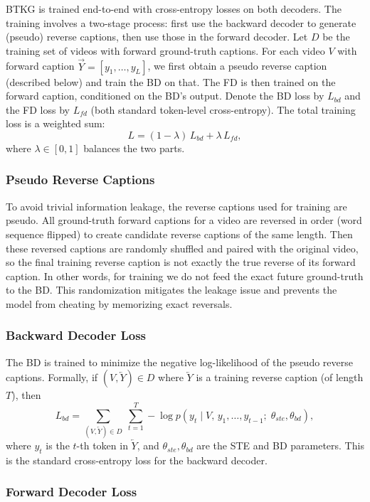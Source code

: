 BTKG is trained end-to-end with cross-entropy losses on both decoders. The training involves a two-stage process: first use the backward decoder to generate (pseudo) reverse captions, then use those in the forward decoder. Let $D$ be the training set of videos with forward ground-truth captions. For each video $V$ with forward caption $\overrightarrow{Y}=[y_1,\dots,y_L]$, we first obtain a pseudo reverse caption (described below) and train the BD on that. The FD is then trained on the forward caption, conditioned on the BD's output. Denote the BD loss by $L_{bd}$ and the FD loss by $L_{fd}$ (both standard token-level cross-entropy). The total training loss is a weighted sum:
$$
L = (1-\lambda)\,L_{bd} + \lambda\,L_{fd},
$$
where $\lambda\in[0,1]$ balances the two parts.

\subsubsection{Pseudo Reverse Captions}

To avoid trivial information leakage, the reverse captions used for training are pseudo. All ground-truth forward captions for a video are reversed in order (word sequence flipped) to create candidate reverse captions of the same length. Then these reversed captions are randomly shuffled and paired with the original video, so the final training reverse caption is not exactly the true reverse of its forward caption. In other words, for training we do not feed the exact future ground-truth to the BD. This randomization mitigates the leakage issue and prevents the model from cheating by memorizing exact reversals.

\subsubsection{Backward Decoder Loss}

The BD is trained to minimize the negative log-likelihood of the pseudo reverse captions. Formally, if $(V,\overleftarrow{Y})\in D$ where $\overleftarrow{Y}$ is a training reverse caption (of length $T$), then
$$
L_{bd} = \sum_{(V,\overleftarrow{Y})\in D}\;\sum_{t=1}^T -\log p(y_t \mid V,\,y_1,\dots,y_{t-1};\;\theta_{ste},\theta_{bd}),
$$
where $y_t$ is the $t$-th token in $\overleftarrow{Y}$, and $\theta_{ste},\theta_{bd}$ are the STE and BD parameters. This is the standard cross-entropy loss for the backward decoder.

\subsubsection{Forward Decoder Loss}

